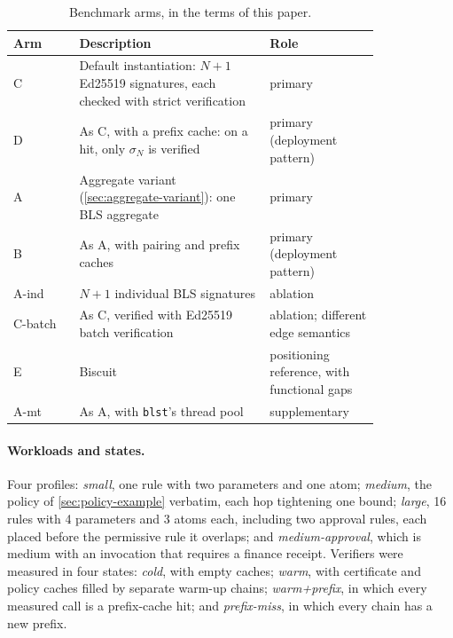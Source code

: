 \documentclass[11pt,a4paper]{article}
\begin{document}
\begin{table}[t]
\centering
\small
\caption{Benchmark arms, in the terms of this paper.}
\label{tab:arms}
\begin{tabular}{@{}l>{\raggedright\arraybackslash}p{0.52\linewidth}>{\raggedright\arraybackslash}p{0.3\linewidth}@{}}
\toprule
Arm & Description & Role \\
\midrule
C & Default instantiation: $N{+}1$ Ed25519 signatures, each checked with
    strict verification & primary \\
D & As C, with a prefix cache: on a hit, only $\sigma_N$ is verified
  & primary (deployment pattern) \\
A & Aggregate variant (\cref{sec:aggregate-variant}): one BLS aggregate
  & primary \\
B & As A, with pairing and prefix caches & primary (deployment pattern) \\
A-ind & $N{+}1$ individual BLS signatures & ablation \\
C-batch & As C, verified with Ed25519 batch verification
        & ablation; different edge semantics \\
E & Biscuit \citep{biscuit-auth-6.0.0} & positioning reference, with
    functional gaps \\
A-mt & As A, with \texttt{blst}'s thread pool & supplementary \\
\bottomrule
\end{tabular}
\end{table}

\paragraph{Workloads and states.}
Four profiles: \emph{small}, one rule with two parameters and one atom;
\emph{medium}, the policy of \cref{sec:policy-example} verbatim, each
hop tightening one bound; \emph{large}, 16 rules with 4 parameters and
3 atoms each, including two approval rules, each placed before the
permissive rule it overlaps; and \emph{medium-approval}, which is medium with an
invocation that requires a finance receipt. Verifiers were measured in
four states: \emph{cold}, with empty caches; \emph{warm}, with
certificate and policy caches filled by separate warm-up chains;
\emph{warm+prefix}, in which every measured call is a prefix-cache hit;
and \emph{prefix-miss}, in which every chain has a new prefix.
\end{document}
